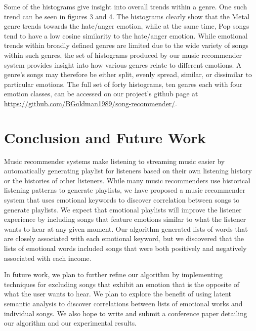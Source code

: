 \documentclass[10pt,twocolumn]{article}
\begin{document}
Some of the histograms give insight into overall trends within a genre. One such trend can be seen in figures 3 and 4. The histograms clearly show that the Metal genre trends towards the hate/anger emotion, while at the same time, Pop songs tend to have a low cosine similarity to the hate/anger emotion. While emotional trends within broadly defined genres are limited due to the wide variety of songs within such genres, the set of histograms produced by our music recommender system provides insight into how various genres relate to different emotions.  A genre's songs may therefore be either split, evenly spread, similar, or dissimilar to particular emotions. The full set of forty histograms, ten genres each with four emotion classes, can be accessed on our project's github page at \url{https://github.com/BGoldman1989/song-recommender/}.

\section{Conclusion and Future Work}
Music recommender systems make listening to streaming music easier by automatically generating playlist for listeners based on their own listening history or the histories of other listeners.  While many music recommenders use historical listening patterns to generate playlists, we have proposed a music recommender system that uses emotional keywords to discover correlation between songs to generate playlists.  We expect that emotional playlists will improve the listener experience by including songs that feature emotions similar to what the listener wants to hear at any given moment.  Our algorithm generated lists of words that are closely associated with each emotional keyword, but we discovered that the lists of emotional words included songs that were both positively and negatively associated with each income.

In future work, we plan to further refine our algorithm by implementing techniques for excluding songs that exhibit an emotion that is the opposite of what the user wants to hear.  We plan to explore the benefit of using latent semantic analysis to discover correlations between lists of emotional works and individual songs.  We also hope to write and submit a conference paper detailing our algorithm and our experimental results.




\end{document}
